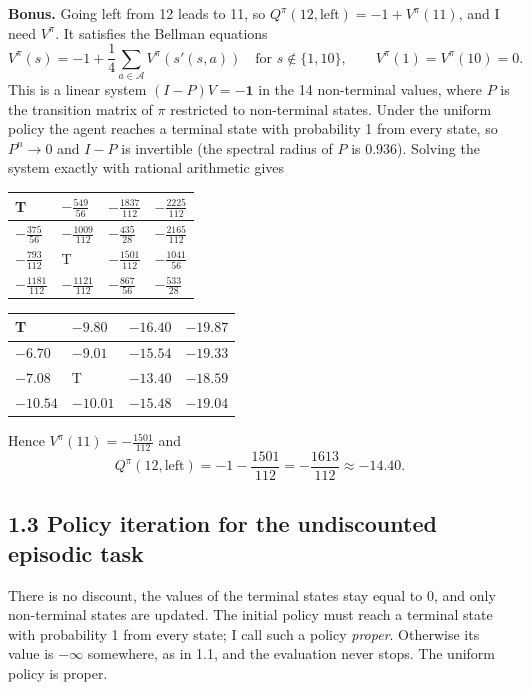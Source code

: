 \documentclass[letterpaper, 11pt]{article}
\newcommand{\1}{\mathds{1}}	%
\theoremstyle{definition}
\newcommand{\T}{\cellcolor[gray]{0.85}T}
\begin{document}
\textbf{Bonus.} Going left from 12 leads to 11, so $Q^\pi(12, \text{left}) = -1 + V^\pi(11)$, and I need $V^\pi$. It satisfies the Bellman equations
\[
V^\pi(s) = -1 + \frac{1}{4} \sum_{a \in \mathcal{A}} V^\pi(s'(s, a)) \quad \text{for } s \notin \{1, 10\}, \qquad V^\pi(1) = V^\pi(10) = 0.
\]
This is a linear system $(I - P)V = -\mathbf{1}$ in the 14 non-terminal values, where $P$ is the transition matrix of $\pi$ restricted to non-terminal states. Under the uniform policy the agent reaches a terminal state with probability 1 from every state, so $P^n \to 0$ and $I - P$ is invertible (the spectral radius of $P$ is $0.936$). Solving the system exactly with rational arithmetic gives
\begin{center}
\renewcommand{\arraystretch}{1.3}
\begin{tabular}{|G|G|G|G|}
\hline
\T & $-\frac{549}{56}$ & $-\frac{1837}{112}$ & $-\frac{2225}{112}$ \\ \hline
$-\frac{375}{56}$ & $-\frac{1009}{112}$ & $-\frac{435}{28}$ & $-\frac{2165}{112}$ \\ \hline
$-\frac{793}{112}$ & \T & $-\frac{1501}{112}$ & $-\frac{1041}{56}$ \\ \hline
$-\frac{1181}{112}$ & $-\frac{1121}{112}$ & $-\frac{867}{56}$ & $-\frac{533}{28}$ \\ \hline
\end{tabular}
\qquad
\begin{tabular}{|G|G|G|G|}
\hline
\T & $-9.80$ & $-16.40$ & $-19.87$ \\ \hline
$-6.70$ & $-9.01$ & $-15.54$ & $-19.33$ \\ \hline
$-7.08$ & \T & $-13.40$ & $-18.59$ \\ \hline
$-10.54$ & $-10.01$ & $-15.48$ & $-19.04$ \\ \hline
\end{tabular}
\end{center}
Hence $V^\pi(11) = -\frac{1501}{112}$ and
\[
Q^\pi(12, \text{left}) = -1 - \frac{1501}{112} = -\frac{1613}{112} \approx -14.40.
\]

\subsection*{1.3 Policy iteration for the undiscounted episodic task}

There is no discount, the values of the terminal states stay equal to 0, and only non-terminal states are updated. The initial policy must reach a terminal state with probability 1 from every state; I call such a policy \emph{proper}. Otherwise its value is $-\infty$ somewhere, as in 1.1, and the evaluation never stops. The uniform policy is proper.
\end{document}
